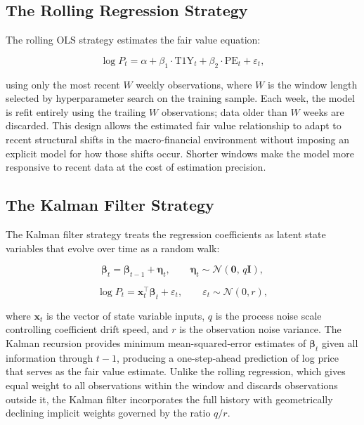 \documentclass[12pt]{article}
\begin{document}
\subsection{The Rolling Regression Strategy}

The rolling OLS strategy estimates the fair value equation:

\begin{equation}
\log P_t = \alpha + \beta_1 \cdot \text{T1Y}_t + \beta_2 \cdot \text{PE}_t + \varepsilon_t,
\label{eq:ols}
\end{equation}

using only the most recent $W$ weekly observations, where $W$ is the window length selected by hyperparameter search on the training sample. Each week, the model is refit entirely using the trailing $W$ observations; data older than $W$ weeks are discarded. This design allows the estimated fair value relationship to adapt to recent structural shifts in the macro-financial environment without imposing an explicit model for how those shifts occur. Shorter windows make the model more responsive to recent data at the cost of estimation precision.

\subsection{The Kalman Filter Strategy}

The Kalman filter strategy treats the regression coefficients as latent state variables that evolve over time as a random walk:

\begin{equation}
\boldsymbol{\beta}_t = \boldsymbol{\beta}_{t-1} + \boldsymbol{\eta}_t, \qquad \boldsymbol{\eta}_t \sim \mathcal{N}(\mathbf{0},\, q \mathbf{I}),
\label{eq:kf_transition}
\end{equation}

\begin{equation}
\log P_t = \mathbf{x}_t^\top \boldsymbol{\beta}_t + \varepsilon_t, \qquad \varepsilon_t \sim \mathcal{N}(0, r),
\label{eq:kf_observation}
\end{equation}

where $\mathbf{x}_t$ is the vector of state variable inputs, $q$ is the process noise scale controlling coefficient drift speed, and $r$ is the observation noise variance. The Kalman recursion provides minimum mean-squared-error estimates of $\boldsymbol{\beta}_t$ given all information through $t-1$, producing a one-step-ahead prediction of log price that serves as the fair value estimate. Unlike the rolling regression, which gives equal weight to all observations within the window and discards observations outside it, the Kalman filter incorporates the full history with geometrically declining implicit weights governed by the ratio $q/r$.
\end{document}
